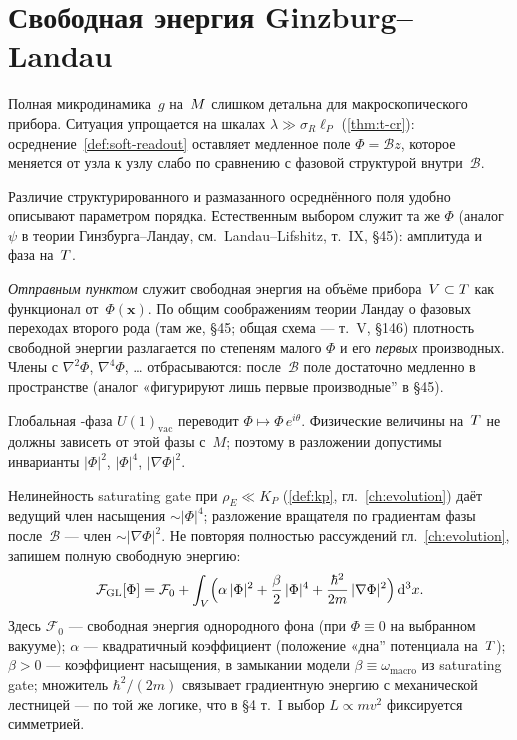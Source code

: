 \section{Свободная энергия Ginzburg--Landau}
\label{sec:gl-free-energy}

Полная микродинамика~$g$ на~$M$ слишком детальна для макроскопического прибора.
Ситуация упрощается на шкалах $\lambda\gg\sigma_R\ell_P$ (\cref{thm:t-cr}): осреднение~\cref{def:soft-readout}
оставляет медленное поле $\Phi=\mathcal{B}z$, которое меняется от узла к узлу слабо по сравнению
с фазовой структурой внутри~$\mathcal{B}$.

Различие структурированного и размазанного осреднённого поля удобно описывают параметром порядка.
Естественным выбором служит та же $\Phi$ (аналог $\psi$ в теории Гинзбурга--Ландау, см.~Landau--Lifshitz, т.~IX, \S45):
амплитуда и фаза на~$T$.

\emph{Отправным пунктом} служит свободная энергия на объёме прибора~$V\subset T$
как функционал от~$\Phi(\mathbf{x})$.
По общим соображениям теории Ландау о фазовых переходах второго рода
(там же, \S45; общая схема --- т.~V, \S146) плотность свободной энергии разлагается
по степеням малого $\Phi$ и его \emph{первых} производных.
Члены с $\nabla^2\Phi$, $\nabla^4\Phi$, \ldots{} отбрасываются: после~$\mathcal{B}$ поле достаточно
медленно в пространстве (аналог «фигурируют лишь первые производные'' в \S45).

Глобальная -фаза $U(1)_{\mathrm{vac}}$ переводит $\Phi\mapsto\Phi\,e^{i\theta}$.
Физические величины на~$T$ не должны зависеть от этой фазы с~$M$;
поэтому в разложении допустимы инварианты $|\Phi|^2$, $|\Phi|^4$, $|\nabla\Phi|^2$.

Нелинейность saturating gate при $\rho_E\ll K_P$ (\cref{def:kp}, гл.~\ref{ch:evolution})
даёт ведущий член насыщения $\sim|\Phi|^4$; разложение вращателя по градиентам фазы
после~$\mathcal{B}$ --- член $\sim|\nabla\Phi|^2$.
Не повторяя полностью рассуждений гл.~\ref{ch:evolution}, запишем полную свободную энергию:
\begin{equation}
\label{eq:gl-free-energy}
  \mathcal{F}_{\mathrm{GL}}[\Phi]
  = \mathcal{F}_0
  + \int_V \Bigl(
      \alpha\,|\Phi|^2
      + \frac{\beta}{2}\,|\Phi|^4
      + \frac{\hbar^2}{2m}\,|\nabla\Phi|^2
    \Bigr)\,\mathrm{d}^3x.
\end{equation}
Здесь $\mathcal{F}_0$ --- свободная энергия однородного фона (при $\Phi\equiv 0$ на выбранном вакууме);
$\alpha$ --- квадратичный коэффициент (положение «дна'' потенциала на~$T$);
$\beta>0$ --- коэффициент насыщения, в замыкании модели $\beta\equiv\omega_{\mathrm{macro}}$ из saturating gate;
множитель $\hbar^2/(2m)$ связывает градиентную энергию с механической лестницей ---
по той же логике, что в \S4 т.~I выбор $L\propto mv^2$ фиксируется симметрией.

